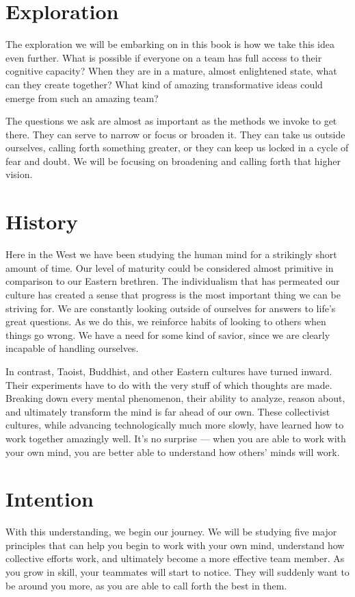 \section{Exploration}

The exploration we will be embarking on in this book is how we take this idea even further. What is possible
if everyone on a team has full access to their cognitive capacity? When they are in a mature, almost
enlightened state, what can they create together? What kind of amazing transformative ideas could emerge
from such an amazing team?

The questions we ask are almost as important as the methods we invoke to get there. They can serve
to narrow or focus or broaden it. They can take us outside ourselves, calling forth something greater, or
they can keep us locked in a cycle of fear and doubt. We will be focusing on broadening and calling
forth that higher vision.

\section{History}

Here in the West we have been studying the human mind for a strikingly short amount of time. Our
level of maturity could be considered almost primitive in comparison to our Eastern brethren. The
individualism that has permeated our culture has created a sense that progress is the most important
thing we can be striving for. We are constantly looking outside of ourselves for answers to life's 
great questions. As we do this, we reinforce habits of looking to others when things go wrong. We
have a need for some kind of savior, since we are clearly incapable of handling ourselves.

In contrast, Taoist, Buddhist, and other Eastern cultures have turned inward. Their experiments have
to do with the very stuff of which thoughts are made. Breaking down every mental phenomenon, their 
ability to analyze, reason about, and ultimately transform the mind is far ahead of our own. These
collectivist cultures, while advancing technologically much more slowly, have learned how to work 
together amazingly well. It's no surprise --- when you are able to work with your own mind, you 
are better able to understand how others' minds will work.

\section{Intention}

With this understanding, we begin our journey. We will be studying five major principles that can help
you begin to work with your own mind, understand how collective efforts work, and ultimately become
a more effective team member. As you grow in skill, your teammates will start to notice. They will 
suddenly want to be around you more, as you are able to call forth the best in them. 